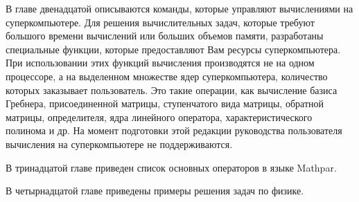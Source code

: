 В главе двенадцатой описываются команды, которые управляют вычислениями на суперкомпьютере.
Для решения вычислительных задач, которые требуют большого времени вычислений или больших объемов памяти, разработаны специальные функции, которые предоставляют Вам ресурсы 
суперкомпьютера. При использовании этих функций вычисления производятся не на одном процессоре, а на выделенном множестве ядер суперкомпьютера, количество которых заказывает пользователь.
Это такие операции, как вычисление базиса Гребнера, присоединенной матрицы,  ступенчатого вида матрицы, обратной матрицы, определителя,  ядра линейного оператора,  характеристического полинома и др. 
На момент подготовки этой редакции руководства пользователя вычисления  на суперкомпьютере не поддерживаются.

В тринадцатой главе приведен список основных операторов в языке Mathpar.

В четырнадцатой главе приведены примеры решения задач по физике.